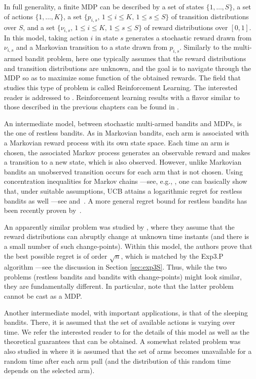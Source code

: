 \documentclass[11pt]{hackednow}
\begin{document}
In full generality, a finite MDP can be described by a set of states $\{1, \hdots, S\}$, a set of actions $\{1,\hdots, K\}$, a set $\{p_{i,s},\, 1 \leq i \leq K,\, 1 \leq s \leq S\}$ of transition distributions over $S$, and a set $\{\nu_{i,s},\, 1 \leq i \leq K,\, 1 \leq s \leq S\}$ of reward distributions over $[0,1]$. In this model, taking action $i$ in state $s$ generates a stochastic reward drawn from $\nu_{i,s}$ and a Markovian transition to a state drawn from $p_{i,s}$. Similarly to the multi-armed bandit problem, here one typically assumes that the reward distributions and transition distributions are unknown, and the goal is to navigate through the MDP so as to maximize some function of the obtained rewards. The field that studies this type of problem is called Reinforcement Learning. The interested reader is addressed to \cite{SB98, Kak03, Sze10}. Reinforcement learning results with a flavor similar to those described in the previous chapters can be found in \cite{YMS09, BM10, JOA10, NGSA10}.

An intermediate model, between stochastic multi-armed bandits and MDPs, is the one of restless bandits. As in Markovian bandits, each arm is associated with a Markovian reward process with its own state space. Each time an arm is chosen, the associated Markov process generates an observable reward and makes a transition to a new state, which is also observed. However, unlike Markovian bandits an unobserved transition occurs for each arm that is not chosen. Using concentration inequalities for Markov chains ---see, e.g., \cite{Lez98}, one can basically show that, under suitable assumptions, UCB attains a logarithmic regret for restless bandits as well ---see \cite{TL11} and~\cite{filippi2011optimally}. A more general regret bound for restless bandits has been recently proven by~\cite{ortner2012regret}.

An apparently similar problem was studied by \cite{GM11}, where they assume that the reward distributions can abruptly change at unknown time instants (and there is a small number of such change-points). Within this model, the authors prove that the best possible regret is of order $\sqrt{n}$, which is matched by the Exp3.P algorithm ---see the discussion in Section \ref{sec:exp3S}. Thus, while the two problems (restless bandits and bandits with change-points) might look similar, they are fundamentally different. In particular, note that the latter problem cannot be cast as a MDP.

Another intermediate model, with important applications, is that of the sleeping bandits. There, it is assumed that the set of available actions is varying over time. We refer the interested reader to \cite{KNS10, KMB09, slivkins2009contextual, KS12} for the details of this model as well as the theoretical guarantees that can be obtained. A somewhat related problem was also studied in \cite{GKSS07} where it is assumed that the set of arms becomes unavailable for a random time after each arm pull (and the distribution of this random time depends on the selected arm).
\end{document}
